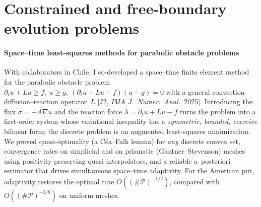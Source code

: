 \documentclass[11pt]{article}
\newcommand{\rc}[1]{\textcolor{accent}{[#1]}}
\begin{document}
\begin{center}
\end{center}
\vspace{-10pt}

\section{Constrained and free-boundary evolution problems}

\paragraph{Space--time least-squares methods for parabolic obstacle problems}
With collaborators in Chile, I co-developed a space--time finite element method
for the parabolic obstacle problem
$\partial_t u+Lu\ge f,\ u\ge g,\ (\partial_t u+Lu-f)(u-g)=0$ with a general
convection--diffusion--reaction operator~$L$ \rc{J2, \emph{IMA J.\ Numer.\ Anal.}\ 2025}.
Introducing the flux $\sigma=-A\nabla u$ and the reaction force
$\lambda=\partial_t u+Lu-f$ turns the problem into a first-order system whose
variational inequality has a \emph{symmetric, bounded, coercive} bilinear form;
the discrete problem is an augmented least-squares minimization. We proved
quasi-optimality (a C\'ea--Falk lemma) for \emph{any} discrete convex set,
convergence rates on simplicial and on prismatic (Gantner--Stevenson) meshes using
positivity-preserving quasi-interpolators, and a reliable a~posteriori estimator
that drives simultaneous space--time adaptivity. For the American put, adaptivity
restores the optimal rate $O((\#\mathcal P)^{-1/2})$, compared with
$O((\#\mathcal P)^{-3/8})$ on uniform meshes.
\end{document}
